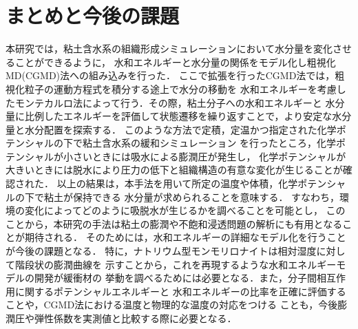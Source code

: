 ﻿\documentclass[11pt,a4j]{jarticle}
\begin{document}
\section{まとめと今後の課題}
本研究では，粘土含水系の組織形成シミュレーションにおいて水分量を変化させることができるように，
水和エネルギーと水分量の関係をモデル化し粗視化MD(CGMD)法への組み込みを行った．
ここで拡張を行ったCGMD法では，粗視化粒子の運動方程式を積分する途上で水分の移動を
水和エネルギーを考慮したモンテカルロ法によって行う．その際，粘土分子への水和エネルギーと
水分量に比例したエネルギーを評価して状態遷移を繰り返すことで，より安定な水分量と水分配置を探索する．
このような方法で定積，定温かつ指定された化学ポテンシャルの下で粘土含水系の緩和シミュレーション
を行ったところ，化学ポテンシャルが小さいときには吸水による膨潤圧が発生し，
化学ポテンシャルが大きいときには脱水により圧力の低下と組織構造の有意な変化が生じることが確認された．
以上の結果は，本手法を用いて所定の温度や体積，化学ポテンシャルの下で粘土が保持できる
水分量が求められることを意味する．
すなわち，環境の変化によってどのように吸脱水が生じるかを調べることを可能とし，
このことから，本研究の手法は粘土の膨潤や不飽和浸透問題の解析にも有用となることが期待される．
そのためには，水和エネルギーの詳細なモデル化を行うことが今後の課題となる．
特に，ナトリウム型モンモリロナイトは相対湿度に対して階段状の膨潤曲線を
示すことから，これを再現するような水和エネルギーモデルの開発が緩衝材の
挙動を調べるためには必要となる．また，分子間相互作用に関するポテンシャルエネルギーと
水和エネルギーの比率を正確に評価することや，CGMD法における温度と物理的な温度の対応をつける
ことも，今後膨潤圧や弾性係数を実測値と比較する際に必要となる．
%
\end{document}
